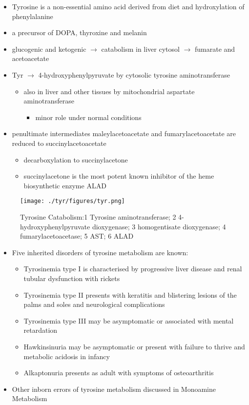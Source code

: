 \documentclass{scrartcl}
\begin{document}
\begin{itemize}
\item Tyrosine is a non-essential amino acid derived from diet and hydroxylation of phenylalanine
\item a precursor of DOPA, thyroxine and melanin
\item glucogenic and ketogenic \(\to\) catabolism in liver cytosol \(\to\) fumarate and acetoacetate
\item Tyr \(\to\) 4-hydroxyphenylpyruvate by cytosolic tyrosine aminotransferase
\begin{itemize}
\item also in liver and other tissues by mitochondrial aspartate aminotransferase
\begin{itemize}
\item minor role under normal conditions
\end{itemize}
\end{itemize}
\item penultimate intermediates maleylacetoacetate and fumarylacetoacetate
are reduced to succinylacetoacetate
\begin{itemize}
\item decarboxylation to succinylacetone
\item succinylacetone is the most potent known inhibitor of the heme biosynthetic enzyme ALAD
\end{itemize}
\end{itemize}

\begin{figure}[htbp]
\centering
\texttt{[image: ./tyr/figures/tyr.png]}
\caption{\label{fig:org51b11bd}
Tyrosine Catabolism:1 Tyrosine aminotransferase; 2 4-hydroxyphenylpyruvate dioxygenase; 3 homogentisate dioxygenase; 4 fumarylacetoacetase; 5 AST; 6 ALAD}
\end{figure}


\begin{itemize}
\item Five inherited disorders of tyrosine metabolism are known:
\begin{itemize}
\item Tyrosinemia type I is characterised by progressive
liver disease and renal tubular dysfunction with rickets
\item Tyrosinemia type II presents with keratitis and
blistering lesions of the palms and soles and neurological
complications
\item Tyrosinemia type III may be asymptomatic or associated with
mental retardation
\item Hawkinsinuria may be asymptomatic or present with failure to
thrive and metabolic acidosis in infancy
\item Alkaptonuria presents as adult with symptoms of osteoarthritis
\end{itemize}
\item Other inborn errors of tyrosine metabolism discussed in Monoamine Metabolism
\end{itemize}
\end{document}
